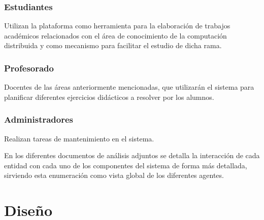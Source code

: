 \subsubsection{Estudiantes}

Utilizan la plataforma como herramienta para la elaboración de trabajos académicos relacionados con el área de conocimiento de la computación distribuida y como mecanismo para facilitar el estudio de dicha rama.

\subsubsection{Profesorado}

Docentes de las áreas anteriormente mencionadas, que utilizarán el sistema para planificar diferentes ejercicios didácticos a resolver por los alumnos.

\subsubsection{Administradores}

Realizan tareas de mantenimiento en el sistema.

\vspace{1.5cm}

En los diferentes documentos de análisis adjuntos se detalla la interacción de cada entidad con cada uno de los componentes del sistema de forma más detallada, sirviendo esta enumeración como vista global de los diferentes agentes.

\section{Diseño}

